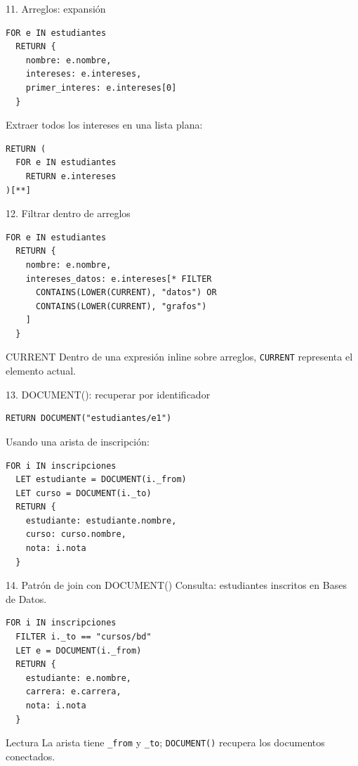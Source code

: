 \documentclass[aspectratio=169,11pt]{beamer}
\begin{document}
\begin{frame}[fragile]{11. Arreglos: expansión}
\begin{lstlisting}
FOR e IN estudiantes
  RETURN {
    nombre: e.nombre,
    intereses: e.intereses,
    primer_interes: e.intereses[0]
  }
\end{lstlisting}

Extraer todos los intereses en una lista plana:
\begin{lstlisting}
RETURN (
  FOR e IN estudiantes
    RETURN e.intereses
)[**]
\end{lstlisting}
\end{frame}

\begin{frame}[fragile]{12. Filtrar dentro de arreglos}
\begin{lstlisting}
FOR e IN estudiantes
  RETURN {
    nombre: e.nombre,
    intereses_datos: e.intereses[* FILTER
      CONTAINS(LOWER(CURRENT), "datos") OR
      CONTAINS(LOWER(CURRENT), "grafos")
    ]
  }
\end{lstlisting}

\begin{block}{CURRENT}
Dentro de una expresión inline sobre arreglos, \texttt{CURRENT} representa el elemento actual.
\end{block}
\end{frame}

\begin{frame}[fragile]{13. DOCUMENT(): recuperar por identificador}
\begin{lstlisting}
RETURN DOCUMENT("estudiantes/e1")
\end{lstlisting}

\vspace{0.2cm}
Usando una arista de inscripción:
\begin{lstlisting}
FOR i IN inscripciones
  LET estudiante = DOCUMENT(i._from)
  LET curso = DOCUMENT(i._to)
  RETURN {
    estudiante: estudiante.nombre,
    curso: curso.nombre,
    nota: i.nota
  }
\end{lstlisting}
\end{frame}

\begin{frame}[fragile]{14. Patrón de join con DOCUMENT()}
Consulta: estudiantes inscritos en Bases de Datos.

\begin{lstlisting}
FOR i IN inscripciones
  FILTER i._to == "cursos/bd"
  LET e = DOCUMENT(i._from)
  RETURN {
    estudiante: e.nombre,
    carrera: e.carrera,
    nota: i.nota
  }
\end{lstlisting}

\begin{block}{Lectura}
La arista tiene \texttt{\_from} y \texttt{\_to}; \texttt{DOCUMENT()} recupera los documentos conectados.
\end{block}
\end{frame}
\end{document}
